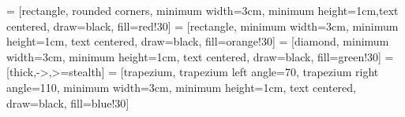 
\newcommand{\class}[1]{{\normalfont\slshape #1\/}}

\newcommand{\Feup}{Faculdade de Engenharia da Universidade do Porto}

\newcommand{\svg}{\class{SVG}}
\newcommand{\scada}{\class{SCADA}}
\newcommand{\scadadms}{\class{SCADA/DMS}}


\newcommand{\mybreak}{\vfill \pagebreak}


\usetikzlibrary{shapes.geometric, arrows}
\usetikzlibrary{arrows.meta, positioning}

 = [rectangle, rounded corners, minimum width=3cm, minimum height=1cm,text centered, draw=black, fill=red!30]
 = [rectangle, minimum width=3cm, minimum height=1cm, text centered, draw=black, fill=orange!30]
 = [diamond, minimum width=3cm, minimum height=1cm, text centered, draw=black, fill=green!30]
 = [thick,->,>=stealth]
 = [trapezium, trapezium left angle=70, trapezium right angle=110, minimum width=3cm, minimum height=1cm, text centered, draw=black, fill=blue!30]




\lstset{style=mystyle}